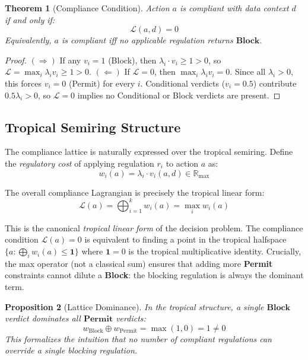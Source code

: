 \documentclass[11pt,twocolumn]{article}
\newtheorem{theorem}{Theorem}
\newtheorem{proposition}[theorem]{Proposition}
\newcommand{\tplus}{\oplus}
\newcommand{\R}{\mathbb{R}}
\newcommand{\Rmax}{\R_{\max}}
\begin{document}
\begin{theorem}[Compliance Condition]
\label{thm:compliance}
Action $a$ is compliant with data context $d$ if and only if:
\begin{equation}
  \mathcal{L}(a, d) = 0
\end{equation}
Equivalently, $a$ is compliant iff no applicable regulation returns $\mathbf{Block}$.
\end{theorem}

\begin{proof}
$(\Rightarrow)$ If any $v_i = 1$ (Block), then $\lambda_i \cdot v_i \geq 1 > 0$,
so $\mathcal{L} = \max_i \lambda_i v_i \geq 1 > 0$.
$(\Leftarrow)$ If $\mathcal{L} = 0$, then $\max_i \lambda_i v_i = 0$.
Since all $\lambda_i > 0$, this forces $v_i = 0$ (Permit) for every $i$.
Conditional verdicts ($v_i = 0.5$) contribute $0.5\lambda_i > 0$, so
$\mathcal{L} = 0$ implies no Conditional or Block verdicts are present.
\end{proof}

\subsection{Tropical Semiring Structure}

The compliance lattice is naturally expressed over the tropical semiring. Define the
\emph{regulatory cost} of applying regulation $r_i$ to action $a$ as:
\begin{equation}
  w_i(a) = \lambda_i \cdot v_i(a, d) \in \Rmax
\end{equation}

The overall compliance Lagrangian is precisely the tropical linear form:
\begin{equation}
  \mathcal{L}(a) = \bigoplus_{i=1}^{k} w_i(a) = \max_i w_i(a)
\end{equation}

This is the canonical \emph{tropical linear form} of the decision problem.
The compliance condition $\mathcal{L}(a) = 0$ is equivalent to finding a point
in the tropical halfspace $\{a : \bigoplus_i w_i(a) \leq \mathbf{1}\}$ where
$\mathbf{1} = 0$ is the tropical multiplicative identity. Crucially, the max
operator (not a classical sum) ensures that adding more \textbf{Permit}
constraints cannot dilute a \textbf{Block}: the blocking regulation is always
the dominant term.

\begin{proposition}[Lattice Dominance]
In the tropical structure, a single $\mathbf{Block}$ verdict dominates all
$\mathbf{Permit}$ verdicts:
\begin{equation}
  w_{\text{Block}} \tplus w_{\text{Permit}} = \max(1, 0) = 1 \neq 0
\end{equation}
This formalizes the intuition that no number of compliant regulations can override
a single blocking regulation.
\end{proposition}
\end{document}
